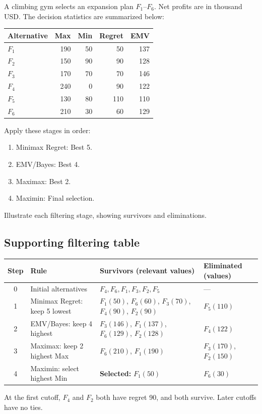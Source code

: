 A climbing gym selects an expansion plan $F_1$--$F_6$. Net profits are in thousand USD. The decision statistics are summarized below:
\vspace{-3mm}
\begin{center}\small\setlength{\tabcolsep}{4pt}
	\begin{tabular}{lrrrr}\toprule
		Alternative & Max & Min & Regret & EMV\\ \midrule
		$F_1$ & 190 & 50 & 50 & 137\\
		$F_2$ & 150 & 90 & 90 & 128\\
		$F_3$ & 170 & 70 & 70 & 146\\
		$F_4$ & 240 & 0 & 90 & 122\\
		$F_5$ & 130 & 80 & 110 & 110\\
		$F_6$ & 210 & 30 & 60 & 129\\
		\bottomrule
	\end{tabular}
\end{center}
\vspace{-3mm}
Apply these stages in order:
\begin{enumerate}[leftmargin=*]
	\item Minimax Regret: Best 5.
	\item EMV/Bayes: Best 4.
	\item Maximax: Best 2.
	\item Maximin: Final selection.
\end{enumerate}
Illustrate each filtering stage, showing survivors and eliminations.
\label{sol:q4table}
\subsection*{Supporting filtering table}
\begin{center}\small
\begin{tabularx}{\textwidth}{@{}c >{\raggedright\arraybackslash}p{} >{\raggedright\arraybackslash}X >{\raggedright\arraybackslash}p{}@{}}
\toprule
Step & Rule & Survivors (relevant values) & Eliminated (values)\\\midrule
0 & Initial alternatives & $F_4,F_6,F_1,F_3,F_2,F_5$ & ---\\
1 & Minimax Regret: keep 5 lowest & $F_1(50)$, $F_6(60)$, $F_3(70)$, $F_4(90)$, $F_2(90)$ & $F_5(110)$\\
2 & EMV/Bayes: keep 4 highest & $F_3(146)$, $F_1(137)$, $F_6(129)$, $F_2(128)$ & $F_4(122)$\\
3 & Maximax: keep 2 highest Max & $F_6(210)$, $F_1(190)$ & $F_3(170)$, $F_2(150)$\\
4 & Maximin: select highest Min & \textbf{Selected:} $F_1(50)$ & $F_6(30)$\\
\bottomrule\end{tabularx}
\end{center}
At the first cutoff, $F_4$ and $F_2$ both have regret 90, and both survive. Later cutoffs have no ties.
\secInicio[sec:q4]

